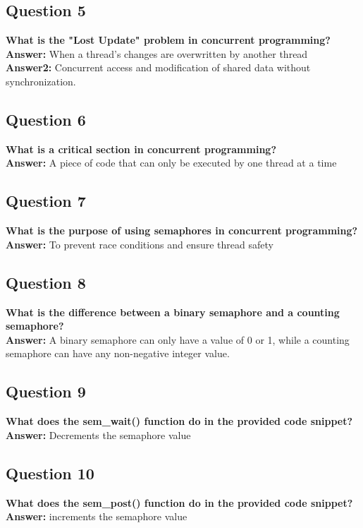 \documentclass[11pt,parskip]{scrartcl}
\begin{document}
\subsection*{Question 5} 
\textbf{What is the "Lost Update" problem in concurrent programming?} \\
\textbf{Answer:} When a thread's changes are overwritten by another thread \\
\textbf{Answer2:} Concurrent access and modification of shared data without synchronization.

\subsection*{Question 6}
\textbf{What is a critical section in concurrent programming?} \\
\textbf{Answer:} A piece of code that can only be executed by one thread at a time

\subsection*{Question 7}
\textbf{What is the purpose of using semaphores in concurrent programming?} \\
\textbf{Answer:} To prevent race conditions and ensure thread safety

\subsection*{Question 8}
\textbf{What is the difference between a binary semaphore and a counting semaphore?} \\
\textbf{Answer:} A binary semaphore can only have a value of 0 or 1, while a counting semaphore can have any non-negative integer value.

\subsection*{Question 9}
\textbf{What does the sem\_wait() function do in the provided code snippet?} \\
\textbf{Answer:} Decrements the semaphore value

\subsection*{Question 10} 
\textbf{What does the sem\_post() function do in the provided code snippet?} \\
\textbf{Answer:} increments the semaphore value
\end{document}
